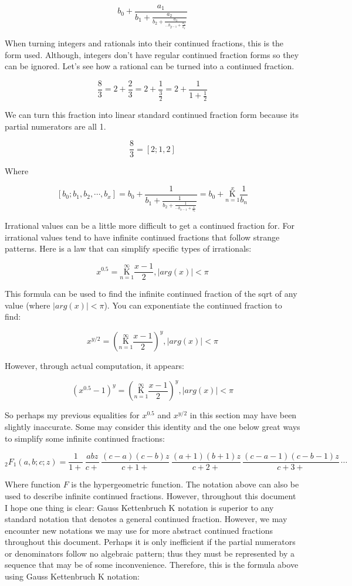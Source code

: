 \documentclass{article}
\begin{document}
$$ b_0 + \frac{a_1}{b_1 + \frac{a_{2}}{b_{2} + \frac{a_{3}}{... b_{y-1} + \frac{a_y}{b_y}}}} $$

When turning integers and rationals into their continued fractions, this is the form used. Although, integers don’t have regular continued fraction forms so they can be ignored. Let’s see how a rational can be turned into a continued fraction.

$$ \frac{8}{3}=2+\frac{2}{3}=2+\frac{1}{\frac{3}{2}}=2+\frac{1}{1+\frac{1}{2}} $$

We can turn this fraction into linear standard continued fraction form because its partial numerators are all 1.

$$ \frac{8}{3} = [2;1,2] $$

Where

$$ [b_0;b_1,b_2,\cdots,b_x] = b_0 +  \frac{1}{b_1 + \frac{1}{b_2 + \frac{1}{\cdots b_{x-1} + \frac{1}{b_x}}}} = b_0 +  \underset{n=1}{\overset{x}{ \mathrm K}} \frac{1}{b_n} $$ 

Irrational values can be a little more difficult to get a continued fraction for. For irrational values tend to have infinite continued fractions that follow strange patterns. Here is a law that can simplify specific types of irrationals:

$$x^{0.5} =  \underset{n=1}{\overset{\infty}{ \mathrm K}} \frac{x-1}{2}, |arg(x)| < \pi $$

This formula can be used to find the infinite continued fraction of the sqrt of any value (where $|arg(x)| < \pi$). You can exponentiate the continued fraction to find:

$$ x^{y/2} = (\underset{n=1}{\overset{\infty}{ \mathrm K}} \frac{x-1}{2})^y, |arg(x)| < \pi$$

However, through actual computation, it appears:

$$ (x^{0.5}-1)^{y} = (\underset{n=1}{\overset{\infty}{ \mathrm K}} \frac{x-1}{2})^y, |arg(x)| < \pi$$

So perhaps my previous equalities for $x^{0.5}$ and $x^{y/2}$ in this section may have been slightly inaccurate. Some may consider this identity and the one below great ways to simplify some infinite continued fractions:

$$ {}_2F_1(a, b; c; z) = \frac{1}{1 +}\, \frac{a b z}{c +}\, \frac{(c-a) (c-b) z}{c+1 +}\, \frac{(a+1) (b+1) z}{c+2 +}\, \frac{(c-a-1) (c-b-1) z}{c+3 +} \, \cdots $$

Where function $F$ is the hypergeometric function. The notation above can also be used to describe infinite continued fractions. However, throughout this document I hope one thing is clear: Gauss Kettenbruch K notation is superior to any standard notation that denotes a general continued fraction. However, we may encounter new notations we may use for more abstract continued fractions throughout this document. Perhaps it is only inefficient if the partial numerators or denominators follow no algebraic pattern; thus they must be represented by a sequence that may be of some inconvenience. Therefore, this is the formula above using Gauss Kettenbruch K notation:
\end{document}
